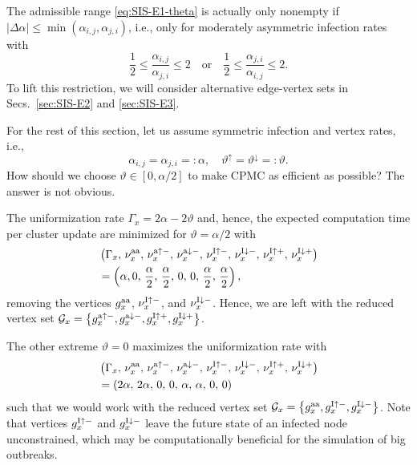 \documentclass[english,10pt,aps,pra,twocolumn,superscriptaddress,floatfix,fleqn]{revtex4-2}
\newcommand{\mc}[1]{\mathcal{#1}}
\newcommand{\G} {\mc{G}}
\newcommand{\tI}{\textnormal{I}}
\newcommand{\ta}{\textnormal{a}}
\newcommand{\taa}{\textnormal{aa}}
\let\up\uparrow
\let\dw\downarrow
\begin{document}
The admissible range \eqref{eq:SIS-E1-theta} is actually only nonempty if $|\Delta\alpha| \leq \min(\alpha_{i,j},\alpha_{j,i})$, i.e., only for moderately asymmetric infection rates with
\begin{equation}\label{eq:SIS-E1-asymRestrict}
	\frac{1}{2} \leq \frac{\alpha_{i,j}}{\alpha_{j,i}} \leq 2
	\quad\text{or}\quad
	\frac{1}{2} \leq \frac{\alpha_{j,i}}{\alpha_{i,j}} \leq 2.
\end{equation}
To lift this restriction, we will consider alternative edge-vertex sets in Secs.~\ref{sec:SIS-E2} and \ref{sec:SIS-E3}.

For the rest of this section, let us assume symmetric infection and vertex rates, i.e.,
\begin{equation}
	\alpha_{i,j}=\alpha_{j,i}=:\alpha,\quad
	\vartheta^\up=\vartheta^\dw=:\vartheta.
\end{equation}
How should we choose $\vartheta\in[0,\alpha/2]$ to make CPMC as efficient as possible? The answer is not obvious.

The uniformization rate $\Gamma_x=2\alpha-2\vartheta$ and, hence, the expected computation time per cluster update are minimized for $\vartheta=\alpha/2$ with
\begin{align}\nonumber
	&\left(\Gamma_x,\,\nu^\taa_x,\,\nu^{\ta\up-}_x,\,\nu^{\ta\dw-}_x,\,\nu^{\tI\up-}_x,\,\nu^{\tI\dw-}_x,\,\nu^{\tI\up+}_x,\,\nu^{\tI\dw+}_x\right)\\
	& =\left(\alpha, 0,\, \frac{\alpha}{2},\, \frac{\alpha}{2},\, 0,\, 0,\, \frac{\alpha}{2},\, \frac{\alpha}{2} \right),
	\label{eq:SIS-E1-thetaMax}
\end{align}
removing the vertices $g^\taa_x$, $\nu^{\tI\up-}_x$, and $\nu^{\tI\dw-}_x$. Hence, we are left with the reduced vertex set $\G_x=\left\{g^{\ta\up-}_x,g^{\ta\dw-}_x,g^{\tI\up+}_x,g^{\tI\dw+}_x\right\}$.

The other extreme $\vartheta=0$ maximizes the uniformization rate with
\begin{align}\nonumber
	&\left(\Gamma_x,\,\nu^\taa_x,\,\nu^{\ta\up-}_x,\,\nu^{\ta\dw-}_x,\,\nu^{\tI\up-}_x,\,\nu^{\tI\dw-}_x,\,\nu^{\tI\up+}_x,\,\nu^{\tI\dw+}_x\right)\\
	& =\left(2\alpha,\, 2\alpha,\, 0,\, 0,\, \alpha,\, \alpha,\, 0,\, 0 \right)
	\label{eq:SIS-E1-theta0}
\end{align}
such that we would work with the reduced vertex set $\G_x=\left\{g^\taa_x,g^{\tI\up-}_x,g^{\tI\dw-}_x\right\}$. Note that vertices $g^{\tI\up-}_x$ and $g^{\tI\dw-}_x$ leave the future state of an infected node unconstrained, which may be computationally beneficial for the simulation of big outbreaks.
\end{document}
